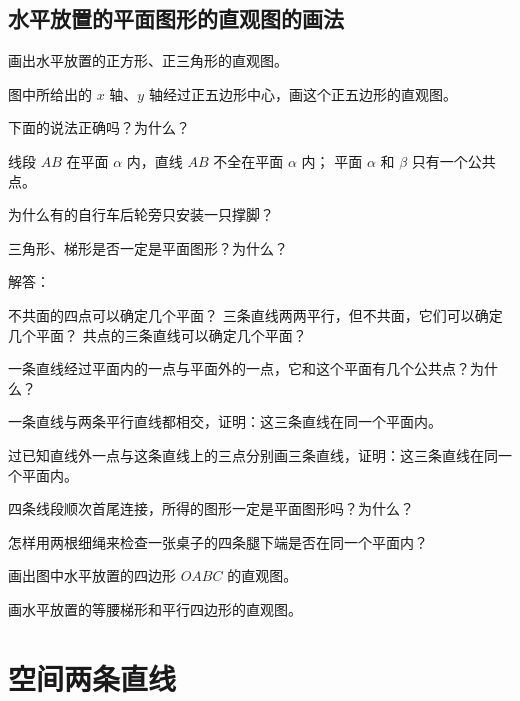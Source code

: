 \subsection{水平放置的平面图形的直观图的画法}
\begin{Practice}
  \begin{question}
    \item 画出水平放置的正方形、正三角形的直观图。
    \item 图中所给出的 $x$ 轴、$y$ 轴经过正五边形中心，画这个正五边形的直观图。
  \end{question}
\end{Practice}
\begin{Exercise}
  \begin{question}
    \item 下面的说法正确吗？为什么？
    \begin{tasks}
      \task 线段 $AB$ 在平面 $\alpha$ 内，直线 $AB$ 不全在平面 $\alpha$ 内；
      \task 平面 $\alpha$ 和 $\beta$ 只有一个公共点。
    \end{tasks}
    \item 为什么有的自行车后轮旁只安装一只撑脚？
    \item 三角形、梯形是否一定是平面图形？为什么？
    \item 解答：
    \begin{tasks}
      \task 不共面的四点可以确定几个平面？
      \task 三条直线两两平行，但不共面，它们可以确定几个平面？
      \task 共点的三条直线可以确定几个平面？
    \end{tasks}
    \item 一条直线经过平面内的一点与平面外的一点，它和这个平面有几个公共点？为什么？
    \item 一条直线与两条平行直线都相交，证明：这三条直线在同一个平面内。 
    \item 过已知直线外一点与这条直线上的三点分别画三条直线，证明：这三条直线在同一个平面内。
    \item 四条线段顺次首尾连接，所得的图形一定是平面图形吗？为什么？
    \item 怎样用两根细绳来检查一张桌子的四条腿下端是否在同一个平面内？
    \item 画出图中水平放置的四边形 $OABC$ 的直观图。
    \item 画水平放置的等腰梯形和平行四边形的直观图。
  \end{question}
\end{Exercise}
\section{空间两条直线}
